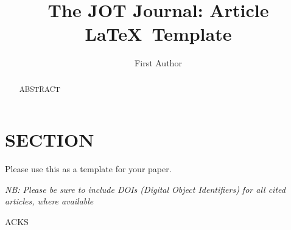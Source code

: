 \documentclass{jot}
\title{The JOT Journal: Article \LaTeX\ Template}
\author[affiliation=orgname, nowrap] %
    {First Author}
    {is ...
    Contact him at \email{EMAIL}, or visit \url{URL}.}
\affiliation{orgname}{ORGANISATION}
\begin{document}
\begin{abstract}
ABSTRACT
\end{abstract}


\section{SECTION}

Please use this as a template for your paper.

\backmatter

\emph{NB: Please be sure to include DOIs (Digital Object Identifiers) for all cited articles, where available}




\abouttheauthors

\begin{acknowledgments}
ACKS
\end{acknowledgments}
\end{document}
